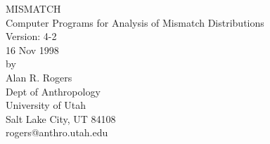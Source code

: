 \begin{titlepage}
\begin{center}
{\Large MISMATCH\\
Computer Programs for Analysis of Mismatch Distributions\\}
\vspace{1em}
Version: 4-2\\
16 Nov 1998\\[1em]
by\\
Alan R. Rogers\\
Dept of Anthropology\\
University of Utah\\
Salt Lake City, UT 84108\\[1em]
rogers@anthro.utah.edu
\end{center}
\end{titlepage}
\tableofcontents                                   
